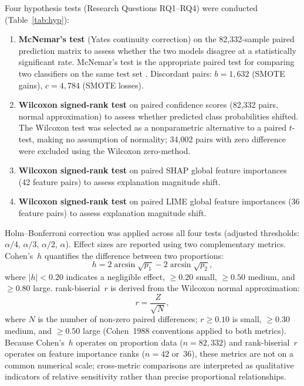 \documentclass[conference,a4paper]{IEEEtran}
\newcommand{\rbs}{rank-biserial~$r$\xspace}
\newcommand{\cohensh}{Cohen's~$h$\xspace}
\begin{document}
Four hypothesis tests (Research Questions RQ1--RQ4) were conducted
(Table~\ref{tab:hyp}):
\begin{enumerate}
  \item \textbf{McNemar's test} (Yates continuity correction) on the 82,332-sample
        paired prediction matrix to assess whether the two models disagree at a
        statistically significant rate. McNemar's test is the appropriate paired
        test for comparing two classifiers on the same test set \cite{virtanen2020}.
        Discordant pairs: $b = 1{,}632$ (SMOTE gains), $c = 4{,}784$ (SMOTE losses).
  \item \textbf{Wilcoxon signed-rank test} on paired confidence scores (82,332
        pairs, normal approximation) to assess whether predicted class
        probabilities shifted. The Wilcoxon test was selected as a nonparametric
        alternative to a paired $t$-test, making no assumption of normality;
        34,002 pairs with zero difference were excluded using the Wilcoxon
        zero-method.
  \item \textbf{Wilcoxon signed-rank test} on paired SHAP global feature
        importances (42 feature pairs) to assess explanation magnitude shift.
  \item \textbf{Wilcoxon signed-rank test} on paired LIME global feature
        importances (36 feature pairs) to assess explanation magnitude shift.
\end{enumerate}

Holm--Bonferroni correction was applied across all four tests (adjusted
thresholds: $\alpha/4,\,\alpha/3,\,\alpha/2,\,\alpha$). Effect sizes are
reported using two complementary metrics. \cohensh quantifies the difference
between two proportions:
\begin{equation}
  h = 2\arcsin\!\sqrt{p_1} - 2\arcsin\!\sqrt{p_2},
  \label{eq:cohenh}
\end{equation}
where $|h|<0.20$ indicates a negligible effect, $\geq 0.20$ small,
$\geq 0.50$ medium, and $\geq 0.80$ large.
\rbs is derived from the Wilcoxon normal approximation:
\begin{equation}
  r = \frac{Z}{\sqrt{N}},
  \label{eq:rbs}
\end{equation}
where $N$ is the number of non-zero paired differences; $r\geq 0.10$ is
small, $\geq 0.30$ medium, and $\geq 0.50$ large (Cohen~1988 conventions
applied to both metrics). Because \cohensh operates on proportion data
($n=82{,}332$) and \rbs operates on feature importance ranks ($n=42$
or~36), these metrics are not on a common numerical scale; cross-metric
comparisons are interpreted as qualitative indicators of relative
sensitivity rather than precise proportional relationships.
\end{document}
